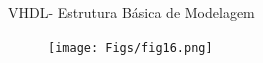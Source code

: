 \documentclass[aspectratio=169]{beamer}
\begin{document}
\begin{frame}{VHDL- Estrutura Básica de Modelagem}
	\justifying
	
	
	\begin{figure}[h]
		\centering
		\texttt{[image: Figs/fig16.png]}
	\end{figure}
	
	
	
\end{frame}
%	
%	
%	
%	
%	
%	
%	
%	
%	
%	
%
%	
%	
%	
%	
%	
\end{document}
